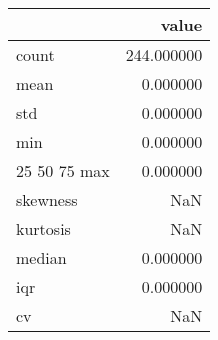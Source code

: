 \begin{tabular}{lr}
\toprule
 & value \\
\midrule
count & 244.000000 \\
mean & 0.000000 \\
std & 0.000000 \\
min & 0.000000 \\
25%
50%
75%
max & 0.000000 \\
skewness & NaN \\
kurtosis & NaN \\
median & 0.000000 \\
iqr & 0.000000 \\
cv & NaN \\
\bottomrule
\end{tabular}
